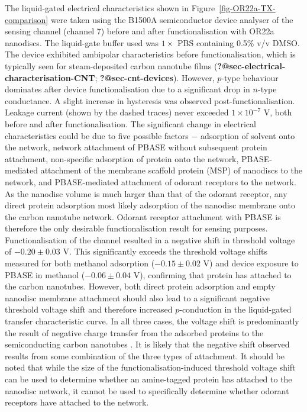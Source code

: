 \documentclass[
  a4paper,
]{scrbook}
\begin{document}
The liquid-gated electrical characteristics shown in
Figure~\ref{fig-OR22a-TX-comparison} were taken using the B1500A
semiconductor device analyser of the sensing channel (channel 7) before
and after functionalisation with OR22a nanodiscs. The liquid-gate buffer
used was \(1 \times\) PBS containing 0.5\% v/v DMSO. The device
exhibited ambipolar characteristics before functionalisation, which is
typically seen for steam-deposited carbon nanotube films
(\textbf{?@sec-electrical-characterisation-CNT};
\textbf{?@sec-cnt-devices}). However, \(p\)-type behaviour dominates
after device functionalisation due to a significant drop in \(n\)-type
conductance. A slight increase in hysteresis was observed
post-functionalisation. Leakage current (shown by the dashed traces)
never exceeded \(1 \times 10^{-7}\) V, both before and after
functionalisation. The significant change in electrical characteristics
could be due to five possible factors \(-\) adsorption of solvent onto
the network, network attachment of PBASE without subsequent protein
attachment, non-specific adsorption of protein onto the network,
PBASE-mediated attachment of the membrane scaffold protein (MSP) of
nanodiscs to the network, and PBASE-mediated attachment of odorant
receptors to the network. As the nanodisc volume is much larger than
that of the odorant receptor, any direct protein adsorption most likely
adsorption of the nanodisc membrane onto the carbon nanotube network.
Odorant receptor attachment with PBASE is therefore the only desirable
functionalisation result for sensing purposes. Functionalisation of the
channel resulted in a negative shift in threshold voltage of
\(-0.20\pm0.03\) V. This significantly exceeds the threshold voltage
shifts measured for both methanol adsorption (\(-0.15\pm0.02\) V) and
device exposure to PBASE in methanol (\(-0.06\pm0.04\) V), confirming
that protein has attached to the carbon nanotubes. However, both direct
protein adsorption \autocite{Bradley2004,Heller2008,Kauffman2008} and
empty nanodisc membrane attachment \autocite{Murugathas2019b} should
also lead to a significant negative threshold voltage shift and
therefore increased \(p\)-conduction in the liquid-gated transfer
characteristic curve. In all three cases, the voltage shift is
predominantly the result of negative charge transfer from the adsorbed
proteins to the semiconducting carbon nanotubes
\autocite{Bradley2004,Heller2008,Murugathas2019b}. It is likely that the
negative shift observed results from some combination of the three types
of attachment. It should be noted that while the size of the
functionalisation-induced threshold voltage shift can be used to
determine whether an amine-tagged protein has attached to the nanodisc
network, it cannot be used to specifically determine whether odorant
receptors have attached to the network.
\end{document}
